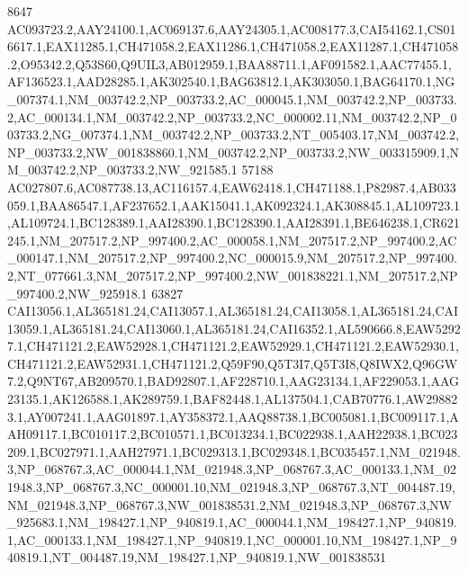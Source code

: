 \documentclass[a4paper]{article}
\begin{document}
\begin{Schunk}
\begin{Soutput}
8647                                                                                                                                                                                                                                                                                                                                                                                                                                                            AC093723.2,AAY24100.1,AC069137.6,AAY24305.1,AC008177.3,CAI54162.1,CS016617.1,EAX11285.1,CH471058.2,EAX11286.1,CH471058.2,EAX11287.1,CH471058.2,O95342.2,Q53S60,Q9UIL3,AB012959.1,BAA88711.1,AF091582.1,AAC77455.1,AF136523.1,AAD28285.1,AK302540.1,BAG63812.1,AK303050.1,BAG64170.1,NG_007374.1,NM_003742.2,NP_003733.2,AC_000045.1,NM_003742.2,NP_003733.2,AC_000134.1,NM_003742.2,NP_003733.2,NC_000002.11,NM_003742.2,NP_003733.2,NG_007374.1,NM_003742.2,NP_003733.2,NT_005403.17,NM_003742.2,NP_003733.2,NW_001838860.1,NM_003742.2,NP_003733.2,NW_003315909.1,NM_003742.2,NP_003733.2,NW_921585.1
57188                                                                                                                                                                                                                                                                                                                                                                                                                                                                                                                                                                                                             AC027807.6,AC087738.13,AC116157.4,EAW62418.1,CH471188.1,P82987.4,AB033059.1,BAA86547.1,AF237652.1,AAK15041.1,AK092324.1,AK308845.1,AL109723.1,AL109724.1,BC128389.1,AAI28390.1,BC128390.1,AAI28391.1,BE646238.1,CR621245.1,NM_207517.2,NP_997400.2,AC_000058.1,NM_207517.2,NP_997400.2,AC_000147.1,NM_207517.2,NP_997400.2,NC_000015.9,NM_207517.2,NP_997400.2,NT_077661.3,NM_207517.2,NP_997400.2,NW_001838221.1,NM_207517.2,NP_997400.2,NW_925918.1
63827  CAI13056.1,AL365181.24,CAI13057.1,AL365181.24,CAI13058.1,AL365181.24,CAI13059.1,AL365181.24,CAI13060.1,AL365181.24,CAI16352.1,AL590666.8,EAW52927.1,CH471121.2,EAW52928.1,CH471121.2,EAW52929.1,CH471121.2,EAW52930.1,CH471121.2,EAW52931.1,CH471121.2,Q59F90,Q5T3I7,Q5T3I8,Q8IWX2,Q96GW7.2,Q9NT67,AB209570.1,BAD92807.1,AF228710.1,AAG23134.1,AF229053.1,AAG23135.1,AK126588.1,AK289759.1,BAF82448.1,AL137504.1,CAB70776.1,AW298823.1,AY007241.1,AAG01897.1,AY358372.1,AAQ88738.1,BC005081.1,BC009117.1,AAH09117.1,BC010117.2,BC010571.1,BC013234.1,BC022938.1,AAH22938.1,BC023209.1,BC027971.1,AAH27971.1,BC029313.1,BC029348.1,BC035457.1,NM_021948.3,NP_068767.3,AC_000044.1,NM_021948.3,NP_068767.3,AC_000133.1,NM_021948.3,NP_068767.3,NC_000001.10,NM_021948.3,NP_068767.3,NT_004487.19,NM_021948.3,NP_068767.3,NW_001838531.2,NM_021948.3,NP_068767.3,NW_925683.1,NM_198427.1,NP_940819.1,AC_000044.1,NM_198427.1,NP_940819.1,AC_000133.1,NM_198427.1,NP_940819.1,NC_000001.10,NM_198427.1,NP_940819.1,NT_004487.19,NM_198427.1,NP_940819.1,NW_001838531

\end{Soutput}
\end{Schunk}
\end{document}
